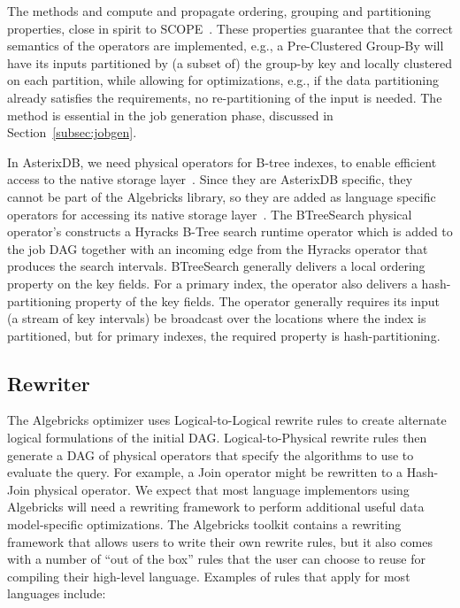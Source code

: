 The methods  and  compute and propagate ordering, grouping and partitioning properties, close in spirit to SCOPE~\cite{ScopeJournal}.
These properties guarantee that the correct semantics of the operators are implemented, e.g., a Pre-Clustered Group-By will have its inputs partitioned by (a subset of) the group-by key and locally clustered on each partition, while allowing for optimizations, e.g., if the data partitioning already satisfies the requirements, no re-partitioning of the input is needed.
The  method is essential in the job generation phase, discussed in Section~\ref{subsec:jobgen}.

In AsterixDB, we need physical operators for B-tree indexes, to enable efficient access to the native storage layer~\cite{storage}. 
Since they are AsterixDB specific, they cannot be part of the Algebricks library, so they are added as language specific operators for accessing its native storage layer~\cite{storage}.
The BTreeSearch physical operator's  constructs a Hyracks B-Tree search runtime operator which is added to the job DAG together with an incoming edge from the Hyracks operator that produces the search intervals. 
BTreeSearch generally delivers a local ordering property on the key fields. For a primary index, the operator also delivers a hash-partitioning property of the key fields.
The operator generally requires its input (a stream of key intervals) be broadcast over the locations where the index is partitioned, but for primary indexes, the required property is hash-partitioning.


\subsection{Rewriter}\label{subsec:rewriter}

The Algebricks optimizer uses Logical-to-Logical rewrite rules to create alternate logical formulations of the initial DAG.
Logical-to-Physical rewrite rules then generate a DAG of physical operators that specify the algorithms to use to evaluate the query.  
For example, a Join operator might be rewritten to a Hash-Join
physical operator. 
We expect that most language implementors using Algebricks will need a rewriting framework to perform additional useful data model-specific optimizations.
The Algebricks toolkit contains a rewriting framework that allows users to write their own rewrite rules, but it also comes with a number of ``out of the box'' rules that the user can choose to reuse for compiling their high-level language.
Examples of rules that apply for most languages include:

